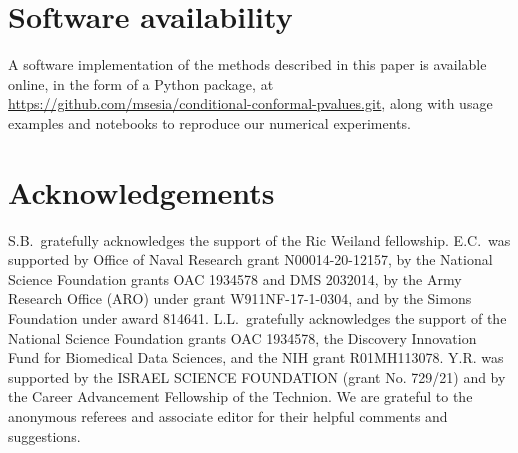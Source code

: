 \documentclass[11pt]{article}
\begin{document}
\section*{Software availability}

A software implementation of the methods described in this paper is available online, in the form of a Python package, at
\url{https://github.com/msesia/conditional-conformal-pvalues.git}, along with usage examples and notebooks to reproduce our numerical experiments.

\section*{Acknowledgements}

S.B.~gratefully acknowledges the support of the Ric Weiland fellowship. E.C.~was supported by Office of Naval Research grant N00014-20-12157, by the National Science Foundation grants OAC 1934578 and DMS 2032014, by the Army Research Office (ARO) under grant W911NF-17-1-0304, and by the Simons Foundation under award 814641.
 L.L.~gratefully acknowledges the support of the National Science Foundation grants OAC 1934578, the Discovery Innovation Fund for Biomedical Data Sciences, and the NIH grant R01MH113078.  Y.R. was supported by the ISRAEL SCIENCE FOUNDATION (grant No. 729/21) and by the Career Advancement Fellowship of the Technion.
We are grateful to the anonymous referees and associate editor for their helpful comments and suggestions.

\printbibliography

\appendix

\renewcommand{\thefigure}{A\arabic{figure}}
\setcounter{figure}{0}
\renewcommand{\thetable}{A\arabic{table}}
\setcounter{table}{0}

 
\end{document}

